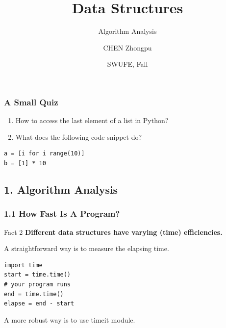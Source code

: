 \documentclass[aspectratio=169, 14pt]{beamer}
\title[Data Structures] %
{Data Structures}
\subtitle{Algorithm Analysis}
\author[CHEN Zhongpu] %
{CHEN Zhongpu}
\institute[] %
{
	School of Computing and Artificial Intelligence \\
	\href{mailto:zpchen@swufe.edu.cn}{zpchen@swufe.edu.cn}
}
\date[] %
{SWUFE, Fall \the\year{}}
\begin{document}
\frame{\titlepage}

\begin{frame}[fragile]
	\frametitle{A Small Quiz}
	\begin{enumerate}
		\item How to access the last element of a \alert{list} in Python?
		\item What does the following code snippet do?
	\end{enumerate}

	\begin{verbatim}
a = [i for i range(10)]
b = [1] * 10
    \end{verbatim}
\end{frame}

{
\begin{frame}
	\section{\textcolor{darkmidnightblue}{1. Algorithm Analysis}}
\end{frame}
}

\begin{frame}[fragile]
	\frametitle{1.1 How Fast Is A Program?}
	\begin{block}{Fact 2}
		\textbf{Different data structures have varying (time) \alert{efficiencies}.}
	\end{block}
	A straightforward way is to measure the elapsing time.
	\begin{verbatim}
import time
start = time.time()
# your program runs
end = time.time()
elapse = end - start
\end{verbatim}
	A more robust way is to use \alert{timeit} module.
\end{frame}
\end{document}
